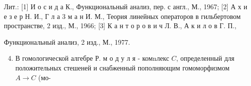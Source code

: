 \documentclass[10pt]{article}
\begin{document}
Лит.: [1] И о с и д а К., Функциональный анализ, пер. с англ., М., 1967; [2] А х и е з е р Н. И., Г л а 3 м а н И. М., Теория линейных операторов в гильбертовом пространстве, 2 изд., М., 1966; [3] К а н т о р о в и ч Л. В., А к и л о в Г. П.,

Функциональный анализ, 2 изд., М., 1977.



\begin{enumerate}

  \setcounter{enumi}{3}

  \item В гомологической алгебре Р. м о д у л я - комnлекс $C$, определенный для положительных стешеней и снабженный пополняющим гомоморфизмом $A \rightarrow C$ (мо-

\end{enumerate}
\end{document}
